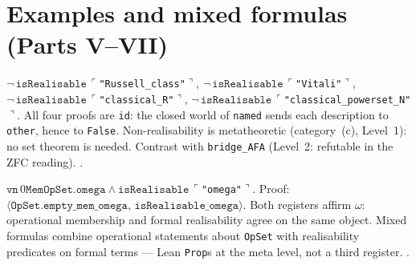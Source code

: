 \section{Examples and mixed formulas (Parts V--VII)}
\label{sec:forms_examples}

\begin{theorem}
\label{thm:not_realisable}
\leanok
{}
$\lnot\,\texttt{isRealisable}\,\ulcorner$\texttt{"Russell\_class"}$\urcorner$,
$\lnot\,\texttt{isRealisable}\,\ulcorner$\texttt{"Vitali"}$\urcorner$,
$\lnot\,\texttt{isRealisable}\,\ulcorner$\texttt{"classical\_R"}$\urcorner$,
$\lnot\,\texttt{isRealisable}\,\ulcorner$\texttt{"classical\_powerset\_N"}$\urcorner$.
All four proofs are \texttt{id}: the closed world of \texttt{named} sends
each description to \texttt{other}, hence to \texttt{False}.
Non-realisability is metatheoretic (category~(c), Level~1): no set theorem
is needed.  Contrast with \texttt{bridge\_AFA} (Level~2: refutable in the
ZFC reading).  \axiomprofile{[]}.
\end{theorem}

\begin{theorem}
\label{thm:mixed_omega}
\leanok
{}
$\mathtt{vn}\,0 \mathrel{\mathtt{Mem}} \texttt{OpSet.omega} \land
\texttt{isRealisable}\,\ulcorner$\texttt{"omega"}$\urcorner$.
Proof: $\langle\texttt{OpSet.empty\_mem\_omega},\,
\texttt{isRealisable\_omega}\rangle$.
Both registers affirm $\omega$: operational membership and formal
realisability agree on the same object.  Mixed formulas combine operational
statements about \texttt{OpSet} with realisability predicates on formal
terms --- Lean \texttt{Prop}s at the meta level, not a third register.
\axiomprofile{[]}.
\end{theorem}

